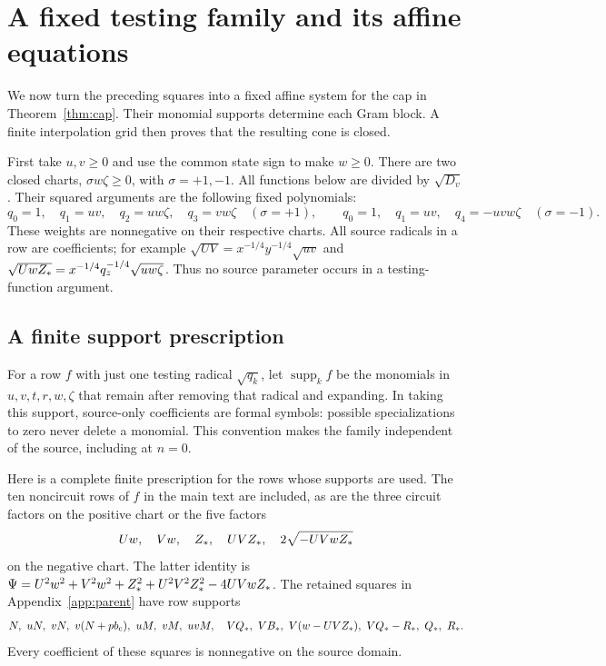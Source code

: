 \section{A fixed testing family and its affine equations}\label{app:functions}
We now turn the preceding squares into a fixed affine system for the cap
in Theorem~\ref{thm:cap}. Their monomial supports determine each Gram
block. A finite interpolation grid then proves that the resulting cone
is closed.

First take $u,v\geq0$ and use the common state sign to make $w\geq0$.
There are two closed charts, $\sigma w\zeta\geq0$, with $\sigma=+1,-1$.
All functions below are divided by $\sqrt{D_v}$. Their squared arguments
are the following fixed polynomials:
\[
 q_0=1,\quad q_1=uv,\quad q_2=uw\zeta,\quad q_3=vw\zeta
       \quad(\sigma=+1),\qquad
 q_0=1,\quad q_1=uv,\quad q_4=-uvw\zeta
       \quad(\sigma=-1).
\]
These weights are nonnegative on their respective charts. All source
radicals in a row are coefficients; for example
$\sqrt{UV}=x^{-1/4}y^{-1/4}\sqrt{uv}$ and
$\sqrt{UwZ_*}=x^{-1/4}q_z^{-1/4}\sqrt{uw\zeta}$.
Thus no source parameter occurs in a testing-function argument.

\subsection*{A finite support prescription}
For a row $f$ with just one testing radical $\sqrt{q_k}$, let
$\operatorname{supp}_k f$ be the monomials in $u,v,t,r,w,\zeta$ that
remain after removing that radical and expanding. In taking this
support, source-only coefficients are formal symbols: possible
specializations to zero never delete a monomial. This convention makes
the family independent of the source, including at $n=0$.

Here is a complete finite prescription for the rows whose supports
are used. The ten noncircuit rows of $f$ in the main text are included,
as are the three circuit factors on the positive chart or the five
factors
\[
 Uw,\quad Vw,\quad Z_*,\quad UVZ_*,\quad2\sqrt{-UVwZ_*}
\]
on the negative chart. The latter identity is
$\Psi=U^2w^2+V^2w^2+Z_*^2+U^2V^2Z_*^2-4UVwZ_*$.
The retained squares in Appendix~\ref{app:parent} have row supports
\begin{gather*}
 N,\ uN,\ vN,\ v(N+pb_{\mathrm c}),\ uM,\ vM,\ uvM,\quad
 VQ_*,\ VB_*,\ V(w-UVZ_*),\ VQ_*-R_*,\ Q_*,\ R_* .
\end{gather*}
Every coefficient of these squares is nonnegative on the source domain.

